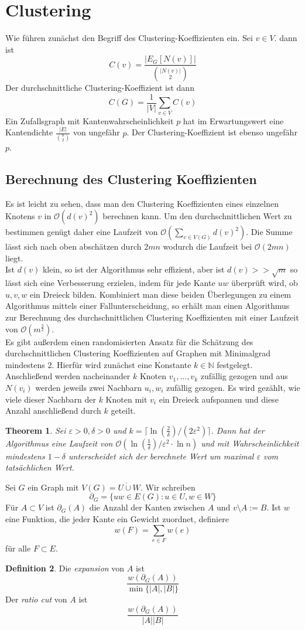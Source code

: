 \documentclass[a4paper, 12pt]{article}
\theoremstyle{plain}
\newtheorem{theorem}{Theorem}[subsection] %
\theoremstyle{definition}
\newtheorem{definition}[theorem]{Definition} %
\theoremstyle{lemma}
\theoremstyle{remark}
\theoremstyle{corollary}
\theoremstyle{example}
\begin{document}
	\section{Clustering}
	Wie führen zunächst den Begriff des Clustering-Koeffizienten ein. Sei $v \in V$. dann ist \[C(v) = \frac{\left|E_G[N(v)]\right|}{\binom{\left|N(v)\right|}{2}}\] Der durchschnittliche Clustering-Koeffizient ist dann \[C(G) = \frac{1}{\left|V\right|} \sum_{v \in V} C(v)\] Ein Zufallsgraph mit Kantenwahrscheinlichkeit $p$ hat im Erwartungswert eine Kantendichte $\frac{\left|E\right|}{\binom{n}{2}}$ von ungefähr $p$. Der Clustering-Koeffizient ist ebenso ungefähr $p$.
	\subsection{Berechnung des Clustering Koeffizienten}
	Es ist leicht zu sehen, dass man den Clustering Koeffizienten eines einzelnen Knotens $v$ in $\mathcal{O}(d(v)^2)$ berechnen kann. Um den durchschnittlichen Wert zu bestimmen genügt daher eine Laufzeit von $\mathcal{O}(\sum_{v \in V(G)} d(v)^2)$. Die Summe lässt sich nach oben abschätzen durch $2mn$ wodurch die Laufzeit bei $\mathcal{O}(2mn)$ liegt.\\
	Ist $d(v)$ klein, so ist der Algorithmus sehr effizient, aber ist $d(v) >> \sqrt{m}$ so lässt sich eine Verbesserung erzielen, indem für jede Kante $uw$ überprüft wird, ob $u,v,w$ ein Dreieck bilden. Kombiniert man diese beiden Überlegungen zu einem Algorithmus mittels einer Fallunterscheidung, so erhält man einen Algorithmus zur Berechnung des durchschnittlichen Clustering Koeffizienten mit einer Laufzeit von $\mathcal{O}(m^\frac{3}{2})$.\\
	Es gibt außerdem einen randomisierten Ansatz für die Schätzung des durchschnittlichen Clustering Koeffizienten auf Graphen mit Minimalgrad mindestens 2. Hierfür wird zunächst eine Konstante $k\in\mathbb{N}$ festgelegt. Anschließend werden nacheinander $k$ Knoten $v_1,...,v_k$ zufällig gezogen und aus $N(v_i)$ werden jeweils zwei Nachbarn $u_i,w_i$ zufällig gezogen. Es wird gezählt, wie viele dieser Nachbarn der $k$ Knoten mit $v_i$ ein Dreieck aufspannen und diese Anzahl anschließend durch $k$ geteilt.
	\begin{theorem}
		Sei $\varepsilon>0, \delta>0$ und $k=\lceil\ln\left(\frac{2}{\delta}\right)/(2\varepsilon^2)\rceil$. Dann hat der Algorithmus eine Laufzeit von $\mathcal{O}(\ln\left(\frac{1}{\delta}\right)/\varepsilon^2\cdot \ln n)$ und mit Wahrscheinlichkeit mindestens $1-\delta$ unterscheidet sich der berechnete Wert um maximal $\varepsilon$ vom tatsächlichen Wert.
	\end{theorem}
	Sei $G$ ein Graph mit $V(G) = U \dot\cup W$. Wir schreiben \[\partial_G = \{uw \in E(G): u \in U, w \in W\}\] Für $A \subset V$ ist $\partial_G(A)$ die Anzahl der Kanten zwischen $A$ und $v\setminus A := B$. Ist $w$ eine Funktion, die jeder Kante ein Gewicht zuordnet, definiere \[w(F) = \sum_{e \in F} w(e)\] für alle $F\subset E$.
	\begin{definition}
		Die \textit{expansion} von $A$ ist \[\frac{w(\partial_G(A))}{\min\{\left|A\right|,\left|B\right|\}}\]
		Der \textit{ratio cut} von $A$ ist \[\frac{w(\partial_G(A))}{\left|A\right|\left|B\right|}\]
	\end{definition}
\end{document}
